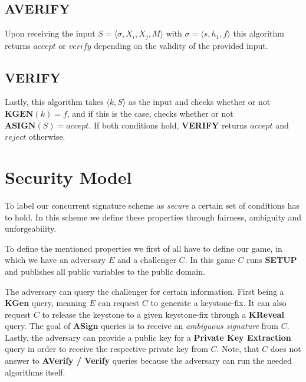 \documentclass[final]{IEEEtran}%
\newcommand{\goedel}[1]{\langle #1 \rangle}
\begin{document}
  \subsection{\textbf{AVERIFY}}
    Upon receiving the input \(S = \goedel{\sigma, X_i, X_j, M}\) with \(\sigma=\goedel{s,h_1, f}\) this algorithm returns \(accept\) or \(verify\) depending on the validity of the provided input.
  
  \subsection{\textbf{VERIFY}}
    Lastly, this algorithm takes \(\goedel{k,S}\) as the input and checks whether or not \(\textbf{KGEN}(k) = f\), and if this is the case, checks whether or not \(\textbf{ASIGN}(S)=accept\).
    If both conditions hold, \textbf{VERIFY} returns \(accept\) and \(reject\) otherwise.

\section{Security Model}
  To label our concurrent signature scheme as \textit{secure} a certain set of conditions has to hold. 
  In this scheme we define these properties through fairness, ambiguity and unforgeability.
  
  To define the mentioned properties we first of all have to define our game, in which we have an adversary \(E\) and a challenger \(C\).
  In this game \(C\) runs \textbf{SETUP} and publishes all public variables to the public domain. 
  
  The adversary can query the challenger for certain information. 
  First being a \textbf{KGen} query, meaning \(E\) can request \(C\) to generate a keystone-fix.
  It can also request \(C\) to release the keystone to a given keystone-fix through a \textbf{KReveal} query.
  The goal of \textbf{ASign} queries is to receive an \textit{ambiguous signature} from \(C\). 
  Lastly, the adversary can provide a public key for a \textbf{Private Key Extraction} query in order to receive the respective private key from \(C\).
  Note, that \(C\) does not answer to \textbf{AVerify / Verify} queries because the adversary can run the needed algorithms itself.
\end{document}
